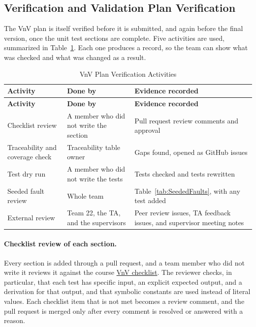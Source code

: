 \documentclass[12pt, titlepage]{article}
\begin{document}
\subsection{Verification and Validation Plan Verification}\label{sec:VnVPlanVerif}

The VnV plan is itself verified before it is submitted, and again before the
final version, once the unit test sections are complete. Five activities are
used, summarized in Table~\ref{tab:PlanVerif}. Each one produces a record, so the
team can show what was checked and what was changed as a result.

{\small
\renewcommand{\arraystretch}{1.2}
\begin{longtable}{>{\raggedright\arraybackslash}p{}
  >{\raggedright\arraybackslash}p{}
  >{\raggedright\arraybackslash}p{}}
\caption{VnV Plan Verification Activities}
\label{tab:PlanVerif}\\
\toprule
\textbf{Activity} & \textbf{Done by} & \textbf{Evidence recorded}\\
\midrule
\endfirsthead
\toprule
\textbf{Activity} & \textbf{Done by} & \textbf{Evidence recorded}\\
\midrule
\endhead
\bottomrule
\endfoot
Checklist review & A member who did not write the section & Pull request review comments and approval\\
Traceability and coverage check & Traceability table owner & Gaps found, opened as GitHub issues\\
Test dry run & A member who did not write the tests & Tests checked and tests rewritten\\
Seeded fault review & Whole team & Table~\ref{tab:SeededFaults}, with any test added\\
External review & Team 22, the TA, and the supervisors & Peer review issues, TA feedback issues, and supervisor meeting notes\\
\end{longtable}
}

\paragraph{Checklist review of each section.}
Every section is added through a pull request, and a team member who did not
write it reviews it against the course
\href{https://github.com/shivyam/cas-course-optimization/blob/main/pdfs/Checklists/VnV-Checklist.pdf}{VnV checklist}. The reviewer checks, in
particular, that each test has specific input, an explicit expected output,
and a derivation for that output, and that symbolic constants are used
instead of literal values. Each checklist item that is not met becomes a review
comment, and the pull request is merged only after every comment is resolved
or answered with a reason.
\end{document}

